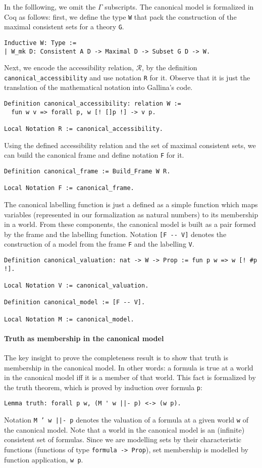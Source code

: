 \documentclass[3p,times]{elsarticle}
\begin{document}
In the folllowing, we omit the $\Gamma$ subscripts. The canonical model is formalized in Coq as follows: first, we define the type \texttt{W} that pack
the construction of the maximal consistent sets for a theory \texttt{G}.
\begin{verbatim}
Inductive W: Type :=
| W_mk D: Consistent A D -> Maximal D -> Subset G D -> W.
\end{verbatim}
Next, we encode the accessibility relation, $\mathcal{R}$, by
the definition \texttt{canonical_accessibility} and use
notation \texttt{R} for it. Observe that it is just the
translation of the mathematical notation into Gallina's code.
\begin{verbatim}
Definition canonical_accessibility: relation W :=
  fun w v => forall p, w [! []p !] -> v p.

Local Notation R := canonical_accessibility.
\end{verbatim}
Using the defined accessibility relation and the set of maximal consistent sets,
we can build the canonical frame and define notation \texttt{F} for it.
\begin{verbatim}
Definition canonical_frame := Build_Frame W R.

Local Notation F := canonical_frame.
\end{verbatim}
The canonical labelling function is just a defined as a simple function which maps variables (represented in
our formalization as natural numbers) to its membership in a world. From these components, the canonical model
is built as a pair formed by the frame and the labelling function. Notation \verb|[F -- V]| denotes the
construction of a model from the frame \verb|F| and the labelling \verb|V|.
\begin{verbatim}
Definition canonical_valuation: nat -> W -> Prop := fun p w => w [! #p !].

Local Notation V := canonical_valuation.

Definition canonical_model := [F -- V].

Local Notation M := canonical_model.
\end{verbatim}

\paragraph{Truth as membership in the canonical model}
The key insight to prove the completeness result is to show that truth is membership in the canonical model.
In other words: a formula is true at a world in the canonical model iff it is a member of that world.
This fact is formalized by the truth theorem, which is proved by induction over formula \verb|p|:
\begin{verbatim}
Lemma truth: forall p w, (M ' w ||- p) <-> (w p).
\end{verbatim}
Notation \texttt{M ' w ||- p} denotes the valuation of a formula at a given world \verb|w| of the
canonical model. Note that a world in the canonical model is an (infinite) consistent set of formulas.
Since we are modelling sets by their characteristic functions (functions of type \texttt{formula -> Prop}),
set membership is modelled by function application, \verb|w p|.
\end{document}
